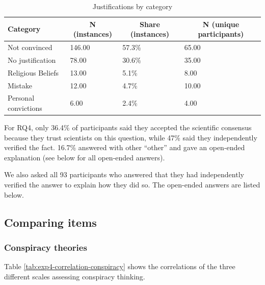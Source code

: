 \documentclass[
  doc,floatsintext]{apa6}
\begin{document}
\begin{table}[tbp]

\begin{center}
\begin{threeparttable}

\caption{\label{tab:exp4-justifications}Justifications by category}

\begin{tabular}{llll}
\toprule
Category & \multicolumn{1}{c}{N (instances)} & \multicolumn{1}{c}{Share (instances)} & \multicolumn{1}{c}{N (unique participants)}\\
\midrule
Not convinced & 146.00 & 57.3\% & 65.00\\
No justification & 78.00 & 30.6\% & 35.00\\
Religious Beliefs & 13.00 & 5.1\% & 8.00\\
Mistake & 12.00 & 4.7\% & 10.00\\
Personal convictions & 6.00 & 2.4\% & 4.00\\
\bottomrule
\end{tabular}

\end{threeparttable}
\end{center}

\end{table}

For RQ4, only 36.4\% of participants said they accepted the scientific consensus because they trust scientists on this question, while 47\% said they independently verified the fact. 16.7\% answered with other ``other'' and gave an open-ended explanation (see below for all open-ended answers).

We also asked all 93 participants who answered that they had independently verified the answer to explain how they did so. The open-ended answers are listed below.

\subsection{Comparing items}\label{comparing-items-3}

\subsubsection{Conspiracy theories}\label{conspiracy-theories-3}

Table \ref{tab:exp4-correlation-conspiracy} shows the correlations of the three different scales assessing conspiracy thinking.
\end{document}
